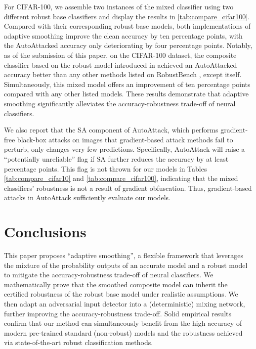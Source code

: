 \documentclass[11pt, letterpaper]{article}
\theoremstyle{plain}
\theoremstyle{definition}
\begin{document}
For CIFAR-100, we assemble two instances of the mixed classifier using two different robust base classifiers and display the results in \cref{tab:compare_cifar100}. Compared with their corresponding robust base models, both implementations of adaptive smoothing improve the clean accuracy by ten percentage points, with the AutoAttacked accuracy only deteriorating by four percentage points. Notably, as of the submission of this paper, on the CIFAR-100 dataset, the composite classifier based on the robust model introduced in \citep{Wang23} achieved an AutoAttacked accuracy better than any other methods listed on RobustBench \citep{Croce20c}, except \citep{Wang23} itself. Simultaneously, this mixed model offers an improvement of ten percentage points compared with any other listed models. These results demonstrate that adaptive smoothing significantly alleviates the accuracy-robustness trade-off of neural classifiers.

We also report that the SA component of AutoAttack, which performs gradient-free black-box attacks on images that gradient-based attack methods fail to perturb, only changes very few predictions. Specifically, AutoAttack will raise a ``potentially unreliable'' flag if SA further reduces the accuracy by at least  percentage points. This flag is not thrown for our models in Tables \ref{tab:compare_cifar10} and \ref{tab:compare_cifar100}, indicating that the mixed classifiers' robustness is not a result of gradient obfuscation. Thus, gradient-based attacks in AutoAttack sufficiently evaluate our models.



\section{Conclusions}

This paper proposes ``adaptive smoothing'', a flexible framework that leverages the mixture of the probability outputs of an accurate model and a robust model to mitigate the accuracy-robustness trade-off of neural classifiers. We mathematically prove that the smoothed composite model can inherit the certified robustness of the robust base model under realistic assumptions. We then adapt an adversarial input detector into a (deterministic) mixing network, further improving the accuracy-robustness trade-off. Solid empirical results confirm that our method can simultaneously benefit from the high accuracy of modern pre-trained standard (non-robust) models and the robustness achieved via state-of-the-art robust classification methods. 
\end{document}
